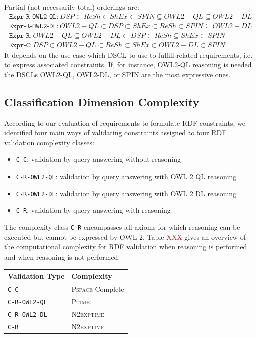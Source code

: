 \documentclass{llncs}
\newcommand{\ms}[1]{\texttt{#1}}
\newenvironment{complexity}{
  \scriptsize
  \sffamily
  \vspace{0.3cm}
  \begin{tabular}{l|l}
  \hline
  \textbf{Validation Type} & \textbf{Complexity} \\
  \hline

}{
  \hline
  \end{tabular}
  \linebreak
}
\begin{document}
Partial (not necessarily total) orderings are:
\begin{eqnarray*}
\ms{Expr-R-OWL2-QL}: DSP \subset ReSh \subset ShEx \subset SPIN \subseteq OWL2-QL \subseteq OWL2-DL \\
\ms{Expr-R-OWL2-DL}: OWL2-QL \subset DSP \subset ShEx \subset ReSh \subset SPIN \subseteq OWL2-DL \\
\ms{Expr-R}: OWL2-QL \subseteq OWL2-DL \subset DSP \subset ReSh \subseteq ShEx \subset SPIN \\
\ms{Expr-C}: DSP \subset OWL2-QL \subset ReSh \subset ShEx \subset OWL2-DL \subset SPIN
\end{eqnarray*}
It depends on the use case which DSCL to use to fulfill related requirements, i.e. to express associated constraints.
If, for instance, OWL2-QL reasoning is needed the DSCLs OWL2-QL, OWL2-DL, or SPIN are the most expressive ones.

\subsection{Classification Dimension Complexity}

According to our evaluation of requirements to formulate RDF constraints, we identified four main ways of validating constraints assigned to four RDF validation complexity classes:

\begin{itemize}
	\item \ms{C-C}: validation by query answering without reasoning
	\item \ms{C-R-OWL2-QL}: validation by query answering with OWL 2 QL reasoning
	\item \ms{C-R-OWL2-DL}: validation by query answering with OWL 2 DL reasoning
	\item \ms{C-R}: validation by query answering with reasoning
\end{itemize}

The complexity class \ms{C-R} encompasses all axioms for which reasoning can be executed but cannot be expressed by OWL 2.  
Table \textcolor{red}{XXX} gives an overview of the computational complexity for RDF validation when reasoning is performed and when reasoning is not performed. 

\begin{complexity}
\ms{C-C} & \textsc{Pspace}-Complete \\
\ms{C-R-OWL2-QL} & \textsc{Ptime} \\
\ms{C-R-OWL2-DL} & \textsc{N2exptime} \\
\ms{C-R} & \textsc{N2exptime} \\
\end{complexity}
\end{document}
